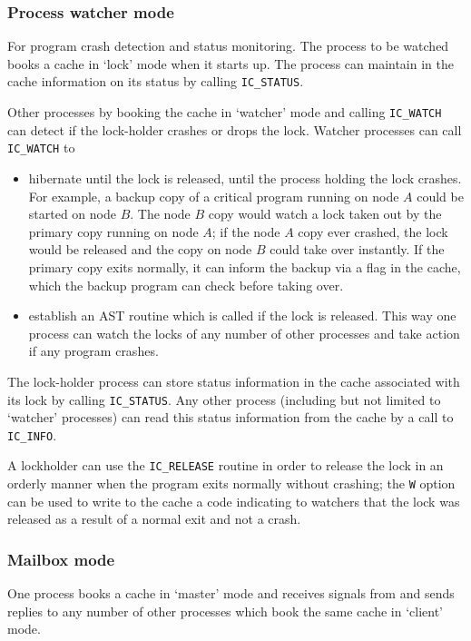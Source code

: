 \subsubsection{Process watcher mode}
   For program crash detection and status monitoring.
   The process to be watched books a cache in `lock' mode when it starts up.
   The process can maintain in the cache information on its status by
   calling \verb|IC_STATUS|.

   Other processes by booking the cache in `watcher' mode and calling
   \verb|IC_WATCH| can detect if the lock-holder crashes or
   drops the lock.
   Watcher processes can call \verb|IC_WATCH| to
     \begin{itemize}
     \item
       hibernate until the lock is released, \ie until the process holding
       the lock crashes. For example, a backup copy of a critical program
       running on node $A$
       could be started on node $B$. The node $B$ copy would watch a
       lock taken out
       by the primary copy running on node $A$; if the node $A$ copy ever
       crashed, the lock would be released and the copy on node $B$
       could take over instantly. If the primary copy exits normally, it
       can inform the backup via a flag in the cache, which the backup
       program can check before taking over.
     \item
       establish an AST routine which is called if the lock is released.
       This way one process can watch the locks of any number of other
       processes and take action if any program crashes.
     \end{itemize}

     The lock-holder process can store status information in the
     cache associated with its lock by calling \verb|IC_STATUS|.
     Any other process (including but not limited to `watcher' processes)
     can read this status information
     from the cache by a call to \verb|IC_INFO|.

A lockholder can use the \verb|IC_RELEASE| routine in order to release
the lock in an orderly manner when the program exits normally without
crashing; the {\tt W} option can be used to write to the cache a
code indicating to watchers that the lock was released as a result of a
normal exit and not a crash.

\subsubsection{Mailbox mode}
  One process books a
  cache in `master' mode and receives signals from and sends replies
  to any number of
  other processes which book the same cache in `client' mode.

